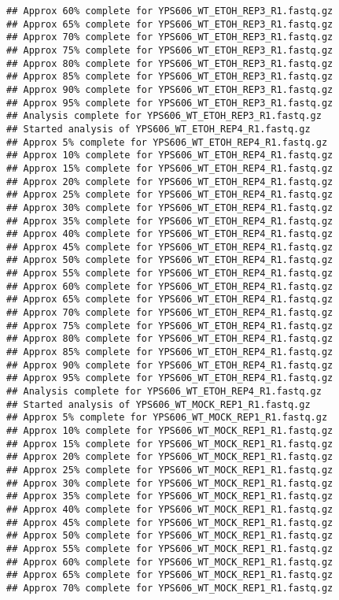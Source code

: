 \documentclass[
]{book}
\begin{document}
\begin{verbatim}
## Approx 60% complete for YPS606_WT_ETOH_REP3_R1.fastq.gz
## Approx 65% complete for YPS606_WT_ETOH_REP3_R1.fastq.gz
## Approx 70% complete for YPS606_WT_ETOH_REP3_R1.fastq.gz
## Approx 75% complete for YPS606_WT_ETOH_REP3_R1.fastq.gz
## Approx 80% complete for YPS606_WT_ETOH_REP3_R1.fastq.gz
## Approx 85% complete for YPS606_WT_ETOH_REP3_R1.fastq.gz
## Approx 90% complete for YPS606_WT_ETOH_REP3_R1.fastq.gz
## Approx 95% complete for YPS606_WT_ETOH_REP3_R1.fastq.gz
## Analysis complete for YPS606_WT_ETOH_REP3_R1.fastq.gz
## Started analysis of YPS606_WT_ETOH_REP4_R1.fastq.gz
## Approx 5% complete for YPS606_WT_ETOH_REP4_R1.fastq.gz
## Approx 10% complete for YPS606_WT_ETOH_REP4_R1.fastq.gz
## Approx 15% complete for YPS606_WT_ETOH_REP4_R1.fastq.gz
## Approx 20% complete for YPS606_WT_ETOH_REP4_R1.fastq.gz
## Approx 25% complete for YPS606_WT_ETOH_REP4_R1.fastq.gz
## Approx 30% complete for YPS606_WT_ETOH_REP4_R1.fastq.gz
## Approx 35% complete for YPS606_WT_ETOH_REP4_R1.fastq.gz
## Approx 40% complete for YPS606_WT_ETOH_REP4_R1.fastq.gz
## Approx 45% complete for YPS606_WT_ETOH_REP4_R1.fastq.gz
## Approx 50% complete for YPS606_WT_ETOH_REP4_R1.fastq.gz
## Approx 55% complete for YPS606_WT_ETOH_REP4_R1.fastq.gz
## Approx 60% complete for YPS606_WT_ETOH_REP4_R1.fastq.gz
## Approx 65% complete for YPS606_WT_ETOH_REP4_R1.fastq.gz
## Approx 70% complete for YPS606_WT_ETOH_REP4_R1.fastq.gz
## Approx 75% complete for YPS606_WT_ETOH_REP4_R1.fastq.gz
## Approx 80% complete for YPS606_WT_ETOH_REP4_R1.fastq.gz
## Approx 85% complete for YPS606_WT_ETOH_REP4_R1.fastq.gz
## Approx 90% complete for YPS606_WT_ETOH_REP4_R1.fastq.gz
## Approx 95% complete for YPS606_WT_ETOH_REP4_R1.fastq.gz
## Analysis complete for YPS606_WT_ETOH_REP4_R1.fastq.gz
## Started analysis of YPS606_WT_MOCK_REP1_R1.fastq.gz
## Approx 5% complete for YPS606_WT_MOCK_REP1_R1.fastq.gz
## Approx 10% complete for YPS606_WT_MOCK_REP1_R1.fastq.gz
## Approx 15% complete for YPS606_WT_MOCK_REP1_R1.fastq.gz
## Approx 20% complete for YPS606_WT_MOCK_REP1_R1.fastq.gz
## Approx 25% complete for YPS606_WT_MOCK_REP1_R1.fastq.gz
## Approx 30% complete for YPS606_WT_MOCK_REP1_R1.fastq.gz
## Approx 35% complete for YPS606_WT_MOCK_REP1_R1.fastq.gz
## Approx 40% complete for YPS606_WT_MOCK_REP1_R1.fastq.gz
## Approx 45% complete for YPS606_WT_MOCK_REP1_R1.fastq.gz
## Approx 50% complete for YPS606_WT_MOCK_REP1_R1.fastq.gz
## Approx 55% complete for YPS606_WT_MOCK_REP1_R1.fastq.gz
## Approx 60% complete for YPS606_WT_MOCK_REP1_R1.fastq.gz
## Approx 65% complete for YPS606_WT_MOCK_REP1_R1.fastq.gz
## Approx 70% complete for YPS606_WT_MOCK_REP1_R1.fastq.gz

\end{verbatim}
\end{document}
